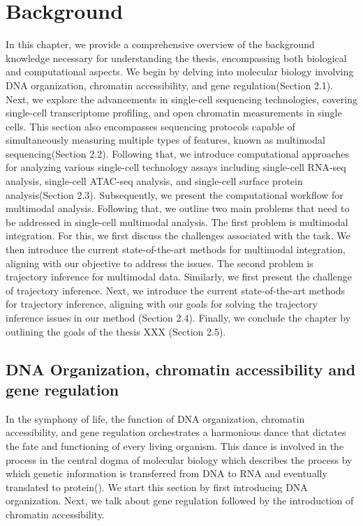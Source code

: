 %

\chapter{Background}
\label{cha:background}
\graphicspath{{chapter2/figs/}}

In this chapter, we provide a comprehensive overview of the background knowledge necessary for understanding the thesis, encompassing both biological and computational aspects. We begin by delving into molecular biology involving DNA organization, chromatin accessibility, and gene regulation(Section 2.1). Next, we explore the advancements in single-cell sequencing technologies, covering single-cell transcriptome profiling, and open chromatin measurements in single cells. This section also encompasses sequencing protocols capable of simultaneously measuring multiple types of features, known as multimodal sequencing(Section 2.2). Following that, we introduce computational approaches for analyzing various single-cell technology assays including single-cell RNA-seq analysis, single-cell ATAC-seq analysis, and single-cell surface protein analysis(Section 2.3). Subsequently, we present the computational workflow for multimodal analysis. Following that, we outline two main problems that need to be addressed in single-cell multimodal analysis. The first problem is multimodal integration. For this, we first discuss the challenges associated with the task. We then introduce the current state-of-the-art methods for multimodal integration, aligning with our objective to address the issues. The second problem is trajectory inference for multimodal data. Similarly, we first present the challenge of trajectory inference. Next, we introduce the current state-of-the-art methods for trajectory inference, aligning with our goals for solving the trajectory inference issues in our method (Section 2.4). Finally, we conclude the chapter by outlining the goals of the thesis XXX (Section 2.5).


\section{DNA Organization, chromatin accessibility and gene regulation}
\label{background:DNA_Chromatin_Regulation}
In the symphony of life, the function of DNA organization, chromatin accessibility, and gene regulation orchestrates a harmonious dance that dictates the fate and functioning of every living organism. This dance is involved in the process in the central dogma of molecular biology\citep{crick1970central} which describes the process by which genetic information is transferred from DNA to RNA and eventually translated to protein(). We start this section by first introducing DNA organization. Next, we talk about gene regulation followed by the introduction of chromatin accessibility.

